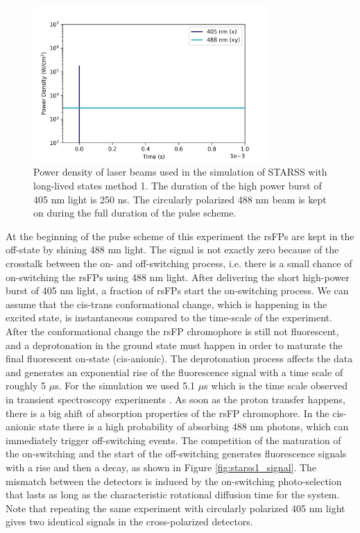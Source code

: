 \documentclass{article}
\begin{document}
\begin{figure}[h!]
    \centering
    \includegraphics[width=0.8\textwidth]
    {figures/starss1_pulse_scheme.png}
    \caption[Power density used in the simulation of STARSS method 1]
    {Power density of laser beams used in the simulation of STARSS with long-lived states method 1. The duration of the high power burst of 405 nm light is 250 ns. The circularly polarized 488 nm beam is kept on during the full duration of the pulse scheme.}
    \label{fig:starss1_pulse_scheme}
\end{figure}

At the beginning of the pulse scheme of this experiment the rsFPs are kept in the off-state by shining 488 nm light. The signal is not exactly zero because of the crosstalk between the on- and off-switching process, i.e. there is a small chance of on-switching the rsFPs using 488 nm light. After delivering the short high-power burst of 405 nm light, a fraction of rsFPs start the on-switching process. We can assume that the cis-trans conformational change, which is happening in the excited state, is instantaneous compared to the time-scale of the experiment. After the conformational change the rsFP chromophore is still not fluorescent, and a deprotonation in the ground state must happen in order to maturate the final fluorescent on-state (cis-anionic).
The deprotonation process affects the data and generates an exponential rise of the fluorescence signal with a time scale of roughly 5 $\mu$s. For the simulation we used 5.1 $\mu$s which is the time scale observed in transient spectroscopy experiments \cite{Woodhouse2020}. 
As soon as the proton transfer happens, there is a big shift of absorption properties of the rsFP chromophore. In the cis-anionic state there is a high probability of absorbing 488 nm photons, which can immediately trigger off-switching events. The competition of the maturation of the on-switching and the start of the off-switching generates fluorescence signals with a rise and then a decay, as shown in Figure \ref{fig:starss1_signal}.
The mismatch between the detectors is induced by the on-switching photo-selection that lasts as long as the characteristic rotational diffusion time for the system. Note that repeating the same experiment with circularly polarized 405 nm light gives two identical signals in the cross-polarized detectors.
\end{document}

